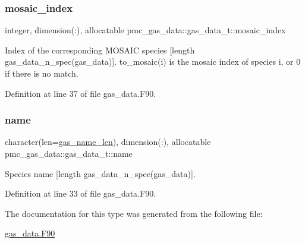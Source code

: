 \subsubsection{\texorpdfstring{mosaic\+\_\+index}{mosaic\_index}}
{\footnotesize\ttfamily integer, dimension(\+:), allocatable pmc\+\_\+gas\+\_\+data\+::gas\+\_\+data\+\_\+t\+::mosaic\+\_\+index}



Index of the corresponding M\+O\+S\+A\+IC species \mbox{[}length {\ttfamily gas\+\_\+data\+\_\+n\+\_\+spec(gas\+\_\+data)}\mbox{]}. {\ttfamily to\+\_\+mosaic(i)} is the mosaic index of species {\ttfamily i}, or 0 if there is no match. 



Definition at line 37 of file gas\+\_\+data.\+F90.

\mbox{\label{structpmc__gas__data_1_1gas__data__t_aebf4763c4d3619032de66b4bfcb7a3a2}} 
\subsubsection{\texorpdfstring{name}{name}}
{\footnotesize\ttfamily character(len=\mbox{\hyperlink{namespacepmc__gas__data_a0d310b1185398e90f841bb9c3c83d3a9}{gas\+\_\+name\+\_\+len}}), dimension(\+:), allocatable pmc\+\_\+gas\+\_\+data\+::gas\+\_\+data\+\_\+t\+::name}



Species name \mbox{[}length {\ttfamily gas\+\_\+data\+\_\+n\+\_\+spec(gas\+\_\+data)}\mbox{]}. 



Definition at line 33 of file gas\+\_\+data.\+F90.



The documentation for this type was generated from the following file\+:\begin{DoxyCompactItemize}
\item 
\mbox{\hyperlink{gas__data_8_f90}{gas\+\_\+data.\+F90}}\end{DoxyCompactItemize}
